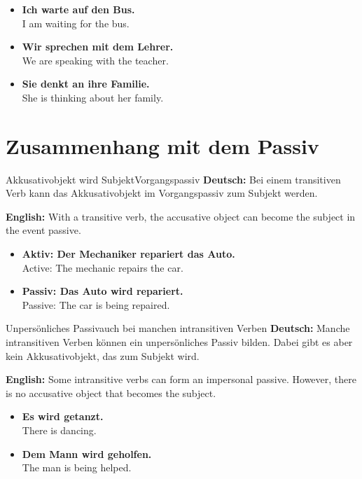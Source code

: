 \documentclass[a4paper,11pt]{article}
\newcommand{\GermanText}[1]{\textbf{Deutsch: }#1\par}
\newcommand{\EnglishText}[1]{{\small\color{SoftGray}\textbf{English: }#1\par}}
\newcommand{\ExampleItem}[2]{\item \textbf{#1}\\{\small\color{SoftGray}#2}}
\begin{document}
        \begin{exbox}
            \begin{itemize}
                \ExampleItem{Ich warte auf den Bus.}{I am waiting for the bus.}
                \ExampleItem{Wir sprechen mit dem Lehrer.}{We are speaking with the teacher.}
                \ExampleItem{Sie denkt an ihre Familie.}{She is thinking about her family.}
            \end{itemize}
        \end{exbox}
    
    
    \section{Zusammenhang mit dem Passiv}
        
        \begin{grammarentry}{Akkusativobjekt wird Subjekt}{Vorgangspassiv}
            \GermanText{Bei einem transitiven Verb kann das Akkusativobjekt im Vorgangspassiv zum Subjekt werden.}
            \EnglishText{With a transitive verb, the accusative object can become the subject in the event passive.}
        \end{grammarentry}
        
        \begin{exbox}
            \begin{itemize}
                \ExampleItem{Aktiv: Der Mechaniker repariert das Auto.}{Active: The mechanic repairs the car.}
                \ExampleItem{Passiv: Das Auto wird repariert.}{Passive: The car is being repaired.}
            \end{itemize}
        \end{exbox}
        
        \begin{grammarentry}{Unpersönliches Passiv}{auch bei manchen intransitiven Verben}
            \GermanText{Manche intransitiven Verben können ein unpersönliches Passiv bilden. Dabei gibt es aber kein Akkusativobjekt, das zum Subjekt wird.}
            \EnglishText{Some intransitive verbs can form an impersonal passive. However, there is no accusative object that becomes the subject.}
        \end{grammarentry}
        
        \begin{exbox}
            \begin{itemize}
                \ExampleItem{Es wird getanzt.}{There is dancing.}
                \ExampleItem{Dem Mann wird geholfen.}{The man is being helped.}
            \end{itemize}
        \end{exbox}
    
\end{document}

